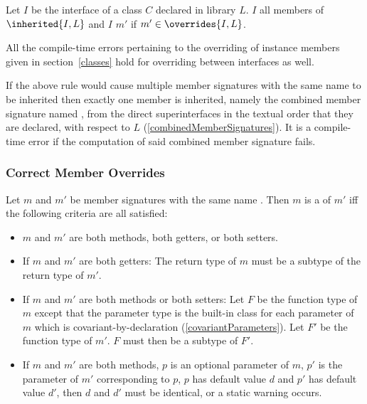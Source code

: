 \documentclass[makeidx]{article}
\begin{document}
\LMHash{}%
Let $I$ be the interface of a class $C$ declared in library $L$.
$I$  all members of $\inherited{I, L}$
and $I$  $m'$ if $m' \in \overrides{I, L}$.

\LMHash{}%
All the compile-time errors pertaining to the overriding of instance members
given in section~\ref{classes} hold for overriding between interfaces as well.

\LMHash{}%
If the above rule would cause multiple member signatures
with the same name \id{} to be inherited then
exactly one member is inherited, namely
the combined member signature named \id,
from the direct superinterfaces
in the textual order that they are declared,
with respect to $L$
(\ref{combinedMemberSignatures}).
It is a compile-time error
if the computation of said combined member signature fails.


\subsubsection{Correct Member Overrides}

\LMHash{}%
%
Let $m$ and $m'$ be member signatures with the same name \id.
Then $m$ is a  of $m'$
if{}f the following criteria are all satisfied:

\begin{itemize}
\item
  $m$ and $m'$ are both methods, both getters, or both setters.
\item
  If $m$ and $m'$ are both getters:
  The return type of $m$ must be a subtype of the return type of $m'$.
\item
  If $m$ and $m'$ are both methods or both setters:
  Let $F$ be the function type of $m$
  except that the parameter type is the built-in class 
  for each parameter of $m$ which is covariant-by-declaration
  (\ref{covariantParameters}).
  Let $F'$ be the function type of $m'$.
  $F$ must then be a subtype of $F'$.

\item
  If $m$ and $m'$ are both methods,
  $p$ is an optional parameter of $m$,
  $p'$ is the parameter of $m'$ corresponding to $p$,
  $p$ has default value $d$ and $p'$ has default value $d'$,
  then $d$ and $d'$ must be identical,
  or a static warning occurs.
\end{itemize}
\end{document}
